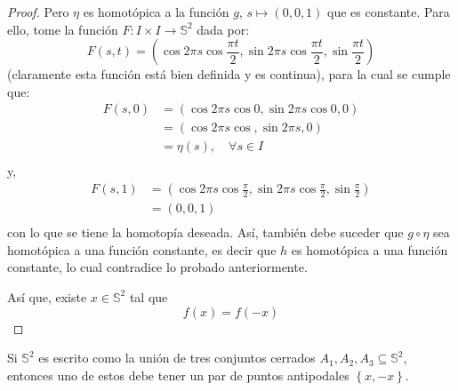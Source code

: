 \documentclass[12pt]{report}
\theoremstyle{largebreak}
\newcommand\cf[3]{\ensuremath{#1:#2\rightarrow#3}}
\begin{document}
\begin{proof}
        Pero $\eta$ es homotópica a la función $g$, $s\mapsto (0,0,1)$ que es constante. Para ello, tome la función $\cf{F}{I\times I}{\mathbb{S}^2}$ dada por:
        \begin{equation*}
            F(s,t)=\left(\cos 2\pi s\cos\frac{\pi t}{2},\sin 2\pi s\cos\frac{\pi t}{2},\sin\frac{\pi t}{2}\right)
        \end{equation*}
        (claramente esta función está bien definida y es continua), para la cual se cumple que:
        \begin{equation*}
            \begin{split}
                F(s,0)&=\left(\cos 2\pi s\cos0,\sin 2\pi s\cos0,0\right)\\
                &=\left(\cos 2\pi s\cos,\sin 2\pi s,0\right)\\
                &=\eta(s),\quad\forall s\in I\\
            \end{split}
        \end{equation*}
        y,
        \begin{equation*}
            \begin{split}
                F(s,1)&=\left(\cos 2\pi s\cos\frac{\pi}{2},\sin 2\pi s\cos\frac{\pi}{2},\sin\frac{\pi}{2}\right)\\
                &=\left(0,0,1\right)\\
            \end{split}
        \end{equation*}
        con lo que se tiene la homotopía deseada. Así, también debe suceder que $g\circ\eta$ sea homotópica a una función constante, es decir que $h$ es homotópica a una función constante, lo cual contradice lo probado anteriormente.

        Así que, existe $x\in\mathbb{S}^2$ tal que
        \begin{equation*}
            f(x)=f(-x)
        \end{equation*}
    \end{proof}

    \begin{cor}
        Si $\mathbb{S}^2$ es escrito como la unión de tres conjuntos cerrados $A_1,A_2,A_3\subseteq\mathbb{S}^2$, entonces uno de estos debe tener un par de puntos antipodales $\left\{x,-x\right\}$.
    \end{cor}
\end{document}
